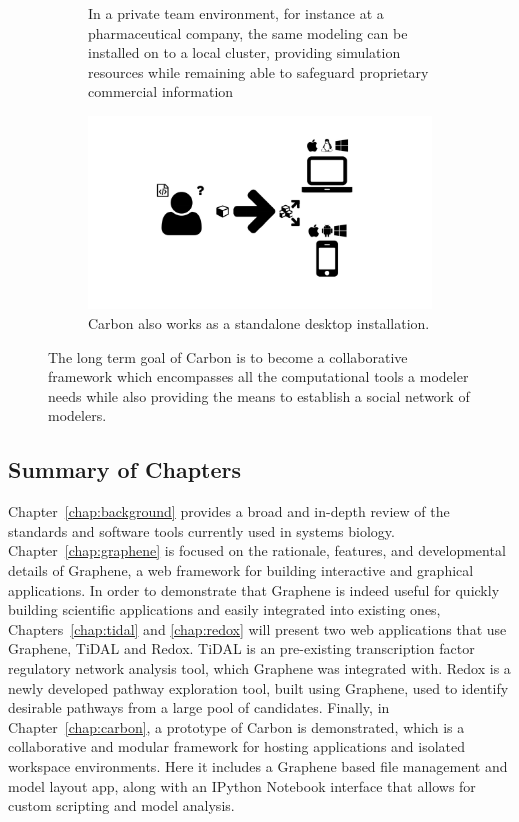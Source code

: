 \begin{figure}
\begin{subfigure}[b]{0.45\textwidth}
    \caption{In a private team environment, for instance at a pharmaceutical company, the same modeling can be installed on to a local cluster, providing simulation resources while remaining able to safeguard proprietary commercial information}
    \label{Figure:carbon-private}
  \end{subfigure}
  \begin{subfigure}[t]{0.45\textwidth}
    \includegraphics[width=\textwidth, page=32, trim=0cm 0cm 17cm 12cm, clip=true]{images/Figures.pdf}
    \caption{Carbon also works as a standalone desktop installation.}
    \label{Figure:carbon-single}
  \end{subfigure}
  \caption{
  The long term goal of Carbon is to become a collaborative framework which encompasses all the computational tools a modeler needs while also providing the means to establish a social network of modelers.
  }
  \label{Figure:carbon-overview}
\end{figure}

\subsection{Summary of Chapters}

Chapter~\ref{chap:background} provides a broad and in-depth review of the standards and software tools currently used in systems biology.
Chapter~\ref{chap:graphene} is focused on the rationale, features, and developmental details of Graphene, a web framework for building interactive and graphical applications.
In order to demonstrate that Graphene is indeed useful for quickly building scientific applications and easily integrated into existing ones, Chapters~\ref{chap:tidal} and \ref{chap:redox} will present two web applications that use Graphene, TiDAL and Redox.
TiDAL is an pre-existing transcription factor regulatory network analysis tool, which Graphene was integrated with.
Redox is a newly developed pathway exploration tool, built using Graphene, used to identify desirable pathways from a large pool of candidates.
Finally, in Chapter~\ref{chap:carbon}, a prototype of Carbon is demonstrated, which is a collaborative and modular framework for hosting applications and isolated workspace environments.
Here it includes a Graphene based file management and model layout app, along with an IPython Notebook interface that allows for custom scripting and model analysis.

